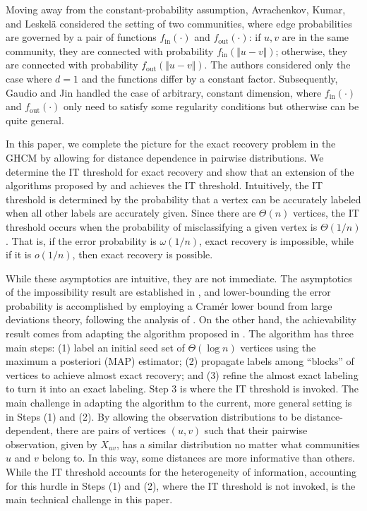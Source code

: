 \documentclass{article}
\newcommand{\1}{\mathbbm{1}}
\theoremstyle{definition}
\theoremstyle{plain}
\begin{document}
Moving away from the constant-probability assumption, Avrachenkov, Kumar, and Leskel\"a \cite{Avrachenkov2024} considered the setting of two communities, where edge probabilities are governed by a pair of functions $f_{\text{in}}(\cdot)$ and $f_{\text{out}}(\cdot)$: if $u,v$ are in the same community, they are connected with probability $f_{\text{in}}(\Vert u - v\Vert)$; otherwise, they are connected with probability $f_{\text{out}}(\Vert u - v\Vert)$. The authors considered only the case where $d=1$ and the functions differ by a constant factor. Subsequently, Gaudio and Jin \cite{GaudioJin2025} handled the case of arbitrary, constant dimension, where $f_{\text{in}}(\cdot)$ and $f_{\text{out}}(\cdot)$ only need to satisfy some regularity conditions but otherwise can be quite general.

In this paper, we complete the picture for the exact recovery problem in the GHCM by allowing for distance dependence in pairwise distributions. We determine the IT threshold for exact recovery and show that an extension of the algorithms proposed by \cite{Gaudio+2025} and \cite{GaudioJin2025} achieves the IT threshold. Intuitively, the IT threshold is determined by the probability that a vertex can be accurately labeled when all other labels are accurately given. Since there are $\Theta(n)$ vertices, the IT threshold occurs when the probability of misclassifying a given vertex is $\Theta(1/n)$. That is, if the error probability is $\omega(1/n)$, exact recovery is impossible, while if it is $o(1/n)$, then exact recovery is possible. 

While these asymptotics are intuitive, they are not immediate. The asymptotics of the impossibility result are established in \cite{Abbe+2020}, and lower-bounding the error probability is accomplished by employing a Cram\'er lower bound from large deviations theory, following the analysis of \cite{Gaudio+2025}. On the other hand, the achievability result comes from adapting the algorithm proposed in \cite{Gaudio+2025}. The algorithm has three main steps: (1) label an initial seed set of $\Theta(\log n)$ vertices using the maximum a posteriori (MAP) estimator; (2) propagate labels among ``blocks'' of vertices to achieve almost exact recovery; and (3) refine the almost exact labeling to turn it into an exact labeling. Step 3 is where the IT threshold is invoked. The main challenge in adapting the algorithm to the current, more general setting is in Steps (1) and (2). By allowing the observation distributions to be distance-dependent, there are pairs of vertices $(u,v)$ such that their pairwise observation, given by $X_{uv}$, has a similar distribution no matter what communities $u$ and $v$ belong to. In this way, some distances are more informative than others. While the IT threshold accounts for the heterogeneity of information, accounting for this hurdle in Steps (1) and (2), where the IT threshold is not invoked, is the main technical challenge in this paper. 
\end{document}
